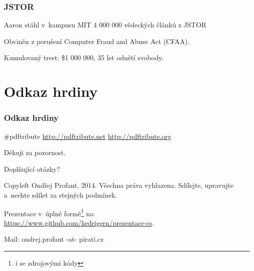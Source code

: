 \documentclass[xetex]{beamer}
\begin{document}
\begin{frame}
	\frametitle{JSTOR}
	Aaron stáhl v~kampusu MIT 4 000 000 vědeckých článků z JSTOR

	\bigskip

	Obviněn z porušení Computer Fraud and Abuse Act (CFAA).

	Kumulovaný trest: \$1 000 000, 35 let odnětí svobody.
\end{frame}

\begin{frame}
\end{frame}

\section{Odkaz hrdiny}
\begin{frame}
	\frametitle{Odkaz hrdiny}
	\#pdftribute \url{http://pdftribute.net} \url{http://pdftribute.org}
\end{frame}


\begin{frame}

	Děkuji za pozornost.

	\bigskip
	
	Doplňující otázky?

	\bigskip

	\bigskip

	\scriptsize
	Copyleft Ondřej Profant, 2014. 
	Všechna práva vyhlazena. Sdílejte, upravujte a~nechte sdílet za stejných podmínek. 

	\bigskip

	Prezentace v~úplné formě\footnote{i se zdrojovými kódy} na:\\ 
	\url{https://www.github.com/kedrigern/prezentace-cs}.

	\bigskip

	Mail: ondrej.profant -at- pirati.cz 
\end{frame}
\end{document}
